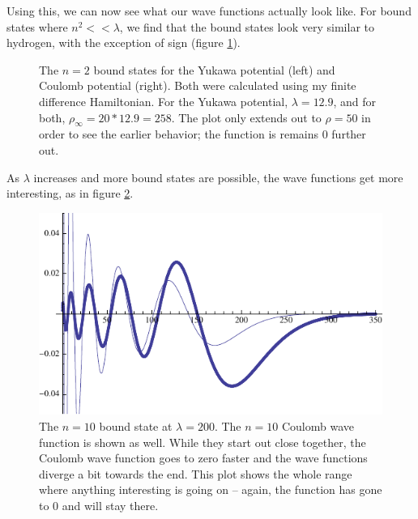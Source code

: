\documentclass[12pt,twoside]{reedthesis}
\begin{document}
Using this, we can now see what our wave functions actually look like. For bound states where $n^2 << \lambda$, we find that the bound states look very similar to hydrogen, with the exception of sign (figure \ref{fig:hyd-yukawa}).
\begin{figure}[h]
\centering
{}
\caption{The $n = 2$ bound states for the Yukawa potential (left) and Coulomb potential (right). Both were calculated using my finite difference Hamiltonian. For the Yukawa potential, $\lambda = 12.9$, and for both, $\rho_{\infty} = 20*12.9 = 258$. The plot only extends out to $\rho = 50$ in order to see the earlier behavior; the function is remains 0 further out.}
\label{fig:hyd-yukawa}
\end{figure}
As $\lambda$ increases and more bound states are possible, the wave functions get more interesting, as in figure \ref{fig:largebound}.
\begin{figure}[h]
\centering
\includegraphics{Figures/hyukawa10}
\caption{The $n=10$ bound state at $\lambda = 200$. The $n=10$ Coulomb wave function is shown as well. While they start out close together, the Coulomb wave function goes to zero faster and the wave functions diverge a bit towards the end. This plot shows the whole range where anything interesting is going on -- again, the function has gone to 0 and will stay there.}
\label{fig:largebound}
\end{figure}
\end{document}
